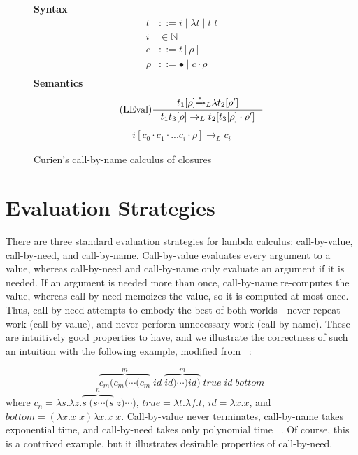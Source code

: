 \begin{figure}
\textbf{Syntax}
\begin{align*}
\tag{Term} t &::= i \; | \; \lambda t \; | \; t \; t  \\
\tag{Variable} i &\in \mathbb{N}  \\
\tag{Closure} c &::= t [\rho] \\
\tag{Environment} \rho &::= \bullet \; | \; c \cdot \rho \\
\end{align*}
\textbf{Semantics}
\begin{align*}
\tag{LEval}\inference
{t_1[\rho] {\xrightarrow{* }}_L \lambda t_2[\rho'] }
{t_1 t_3[\rho] \rightarrow_L t_2[t_3[\rho] \cdot \rho'] } 
\end{align*}
\begin{align*}
\tag{LVar} i [c_0 \cdot c_1 \cdot ... c_i \cdot \rho] \rightarrow_L c_i
\end{align*}
\caption{Curien's call-by-name calculus of closures ~\cite{curien1991abstract}}
\label{fig:calcclos}
\end{figure}

\section{Evaluation Strategies} \label{sec:eval}

There are three standard evaluation strategies for lambda calculus:
call-by-value, call-by-need, and call-by-name.  Call-by-value evaluates every argument
to a value, whereas call-by-need and call-by-name only evaluate an argument if
it is needed.  If an argument is needed more than once, call-by-name re-computes
the value, whereas call-by-need memoizes the value, so it is computed at most once.
Thus, call-by-need attempts to embody the best of both worlds---never repeat
work (call-by-value), and never perform unnecessary work (call-by-name). These
are intuitively good properties to have, and we illustrate the
correctness of such an intuition with the following example, modified from
~\cite{danvy2013synthetic}:


$$ \overbrace{c_m (c_m (\cdots(c_m}^{m} \; \mathit{id} \;
\overbrace{\mathit{id})\cdots) \mathit{id})}^{m} \; \mathit{true} \;
\mathit{id} \; \mathit{bottom} $$ where $c_n = \lambda s.\lambda z.\overbrace{s
\; (s \cdots (s}^{n} \; z) \cdots) $, $\mathit{true} = \lambda t.\lambda f.t$,
$\mathit{id}=\lambda x.x$, and \\ $\mathit{bottom} = (\lambda x.x \; x) \lambda x.x \; x$.
Call-by-value never terminates,
call-by-name takes exponential time, and call-by-need takes only polynomial time
~\cite{danvy2013synthetic}. Of course, this is a contrived example, but it
illustrates desirable properties of call-by-need.

